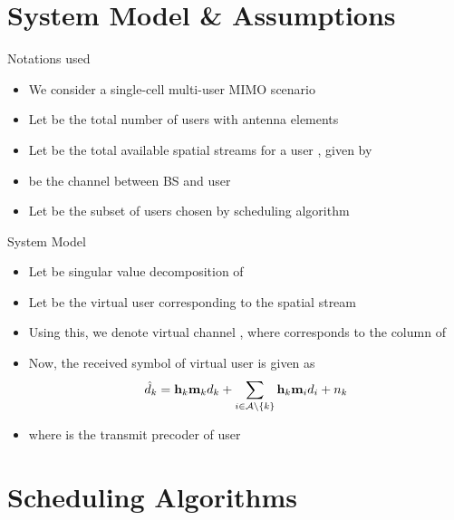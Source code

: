 \documentclass[11pt]{beamer}
\begin{document}
\section{System Model \& Assumptions}

\begin{frame}{Notations used}
\begin{itemize}
\item We consider a single-cell multi-user \ac{MIMO} scenario
\item Let  be the total number of users with  antenna elements
\item Let \me{\kappa} be the total available spatial streams for a user , given by 
\item {} be the channel between \ac{BS} and user 
\item Let  be the subset of users chosen by scheduling algorithm
\end{itemize}
\end{frame}

\begin{frame}{System Model}
\begin{itemize}
\item Let  be singular value decomposition of 
\item Let  be the virtual user corresponding to the spatial stream 
\item Using this, we denote virtual channel , where  corresponds to the column  of 
\item Now, the received symbol  of virtual user  is given as
\[\hat{d}_k = \mathbf{h}_{k} \mathbf{m}_{k} d_k + \sum_{i \in \mathcal{A} \backslash \{k\}} \mathbf{h}_{k} \mathbf{m}_{i} d_i + {n}_{k}\]
\item where  is the transmit precoder of user 
\end{itemize}
\end{frame}

\section{Scheduling Algorithms}
\end{document}
